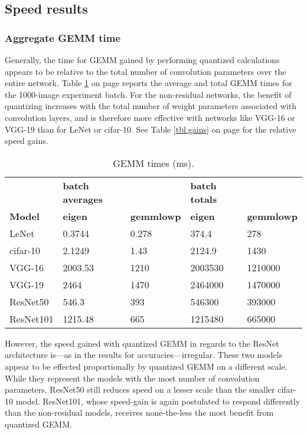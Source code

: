 \subsection{Speed results}
\subsubsection{Aggregate GEMM time}
Generally, the time for GEMM gained by performing quantized calculations appears to be relative to the total number of convolution parameters over the entire network. Table \ref{tbl:gemmtime} on page \pageref{tbl:gemmtime} reports the average and total GEMM times for the 1000-image experiment batch. For the non-residual networks, the benefit of quantizing increases with the total number of weight parameters associated with convolution layers, and is therefore more effective with networks like VGG-16 or VGG-19 than for LeNet or cifar-10. See Table \ref{tbl:gains} on page \pageref{tbl:gains} for the relative speed gains.

\begin{table}[]
\centering
\caption[GEMM timings]{GEMM times (ms).}
\label{tbl:gemmtime}
\begin{tabular}{lllll}
& \textbf{batch averages}   &                              & \textbf{batch totals}     &     \\
\textbf{Model}     & \textbf{eigen} & \textbf{gemmlowp} & \textbf{eigen} & \textbf{gemmlowp} \\
LeNet     & 0.3744         & 0.278             & 374.4          & 278               \\
cifar-10  & 2.1249         & 1.43              & 2124.9         & 1430              \\
VGG-16    & 2003.53        & 1210              & 2003530        & 1210000           \\
VGG-19    & 2464           & 1470              & 2464000        & 1470000           \\
ResNet50  & 546.3          & 393               & 546300         & 393000            \\
ResNet101 & 1215.48        & 665               & 1215480        & 665000           
\end{tabular}
\end{table}

However, the speed gained with quantized GEMM in regards to the ResNet architecture is---as in the results for accuracies---irregular. These two models appear to be effected proportionally by quantized GEMM on a different scale. While they represent the models with the most number of convolution parameters, ResNet50 still reduces speed on a lesser scale than the smaller cifar-10 model. ResNet101, whose speed-gain is again postulated to respond differently than the non-residual models, receives none-the-less the most benefit from quantized GEMM.


